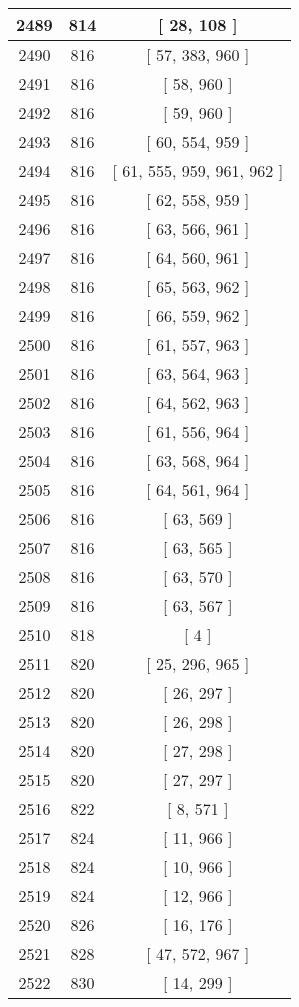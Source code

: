 \begin{center}
\begin{longtable}[H]{|| c c c ||}
\hline
2489 & 814 & [ 28, 108 ] \\ 
\hline
2490 & 816 & [ 57, 383, 960 ] \\ 
\hline
2491 & 816 & [ 58, 960 ] \\ 
\hline
2492 & 816 & [ 59, 960 ] \\ 
\hline
2493 & 816 & [ 60, 554, 959 ] \\ 
\hline
2494 & 816 & [ 61, 555, 959, 961, 962 ] \\ 
\hline
2495 & 816 & [ 62, 558, 959 ] \\ 
\hline
2496 & 816 & [ 63, 566, 961 ] \\ 
\hline
2497 & 816 & [ 64, 560, 961 ] \\ 
\hline
2498 & 816 & [ 65, 563, 962 ] \\ 
\hline
2499 & 816 & [ 66, 559, 962 ] \\ 
\hline
2500 & 816 & [ 61, 557, 963 ] \\ 
\hline
2501 & 816 & [ 63, 564, 963 ] \\ 
\hline
2502 & 816 & [ 64, 562, 963 ] \\ 
\hline
2503 & 816 & [ 61, 556, 964 ] \\ 
\hline
2504 & 816 & [ 63, 568, 964 ] \\ 
\hline
2505 & 816 & [ 64, 561, 964 ] \\ 
\hline
2506 & 816 & [ 63, 569 ] \\ 
\hline
2507 & 816 & [ 63, 565 ] \\ 
\hline
2508 & 816 & [ 63, 570 ] \\ 
\hline
2509 & 816 & [ 63, 567 ] \\ 
\hline
2510 & 818 & [ 4 ] \\ 
\hline
2511 & 820 & [ 25, 296, 965 ] \\ 
\hline
2512 & 820 & [ 26, 297 ] \\ 
\hline
2513 & 820 & [ 26, 298 ] \\ 
\hline
2514 & 820 & [ 27, 298 ] \\ 
\hline
2515 & 820 & [ 27, 297 ] \\ 
\hline
2516 & 822 & [ 8, 571 ] \\ 
\hline
2517 & 824 & [ 11, 966 ] \\ 
\hline
2518 & 824 & [ 10, 966 ] \\ 
\hline
2519 & 824 & [ 12, 966 ] \\ 
\hline
2520 & 826 & [ 16, 176 ] \\ 
\hline
2521 & 828 & [ 47, 572, 967 ] \\ 
\hline
2522 & 830 & [ 14, 299 ] \\ 

\end{longtable}
\end{center}
